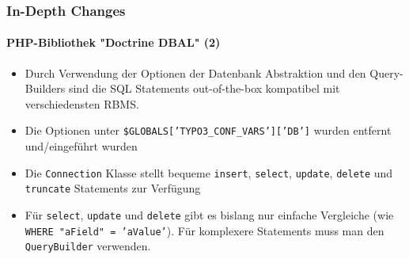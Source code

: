 \begin{frame}[fragile]
	\frametitle{In-Depth Changes}
	\framesubtitle{PHP-Bibliothek "Doctrine DBAL" (2)}

	\begin{itemize}

		\item Durch Verwendung der Optionen der Datenbank Abstraktion und den Query-Builders sind die SQL Statements out-of-the-box kompatibel mit verschiedensten RBMS.

		\item Die Optionen unter \texttt{\$GLOBALS['TYPO3\_CONF\_VARS']['DB']} wurden entfernt und/eingeführt wurden

		\item Die \texttt{Connection} Klasse stellt bequeme
			\texttt{insert}, \texttt{select}, \texttt{update}, \texttt{delete} und
			\texttt{truncate} Statements zur Verfügung

		\item Für \texttt{select}, \texttt{update} und \texttt{delete} gibt es bislang nur einfache Vergleiche  (wie \texttt{WHERE "aField" = 'aValue'}).
			Für komplexere Statements muss man den \texttt{QueryBuilder} verwenden.

	\end{itemize}

\end{frame}

